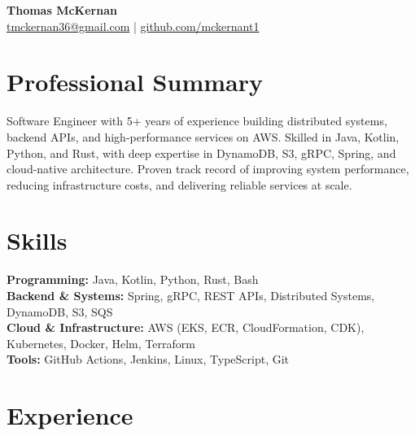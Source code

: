 \documentclass[11pt]{article}
\begin{document}
    \begin{center}
        {\LARGE \textbf{Thomas McKernan}}
        \\
        \vspace{2mm}
        \href{mailto:tmckernan36@gmail.com}{tmckernan36@gmail.com} \quad|\quad
        \href{https://github.com/mckernant1}{github.com/mckernant1}
    \end{center}

    \section*{Professional Summary}
    Software Engineer with 5+ years of experience building distributed systems, backend APIs, and high-performance services on AWS.
    Skilled in Java, Kotlin, Python, and Rust, with deep expertise in DynamoDB, S3, gRPC, Spring, and cloud-native architecture.
    Proven track record of improving system performance, reducing infrastructure costs, and delivering reliable services at scale.

    \section*{Skills}
    \textbf{Programming:} Java, Kotlin, Python, Rust, Bash \\
    \textbf{Backend \& Systems:} Spring, gRPC, REST APIs, Distributed Systems, DynamoDB, S3, SQS \\
    \textbf{Cloud \& Infrastructure:} AWS (EKS, ECR, CloudFormation, CDK), Kubernetes, Docker, Helm, Terraform \\
    \textbf{Tools:} GitHub Actions, Jenkins, Linux, TypeScript, Git

    \section*{Experience}
\end{document}
